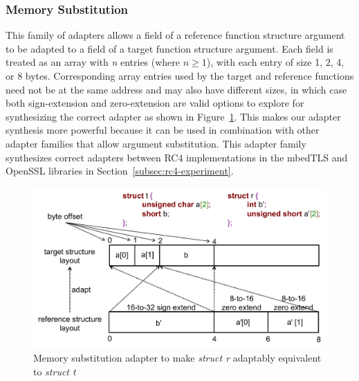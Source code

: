 \subsubsection{Memory Substitution}
This family of adapters allows a field of a reference function structure argument to be adapted to a field of a target function structure argument.
%
Each field is treated as an array with \textit{n} entries (where $n \geq
1$), with each entry of size 1, 2, 4, or 8 bytes.
%
Corresponding array entries used by the target and reference functions need not be at the same address and may also have different sizes, in which case both sign-extension and zero-extension are valid options to explore for synthesizing the correct adapter as shown in Figure~\ref{fig:memsub}.
%
This makes our adapter synthesis more powerful because it can be used in
combination with other adapter families that allow argument substitution. 
%
This adapter family synthesizes correct adapters between RC4 implementations in the mbedTLS and OpenSSL libraries in Section~\ref{subsec:rc4-experiment}.
%
\begin{figure}[h]
\caption{Memory substitution adapter to make \textit{struct r} adaptably equivalent to \textit{struct t}}
\label{fig:memsub}
\includegraphics[width=\widthfactor\columnwidth]{chapters/adapter_synthesis/figures/memsub_pdf6}
\end{figure}  
